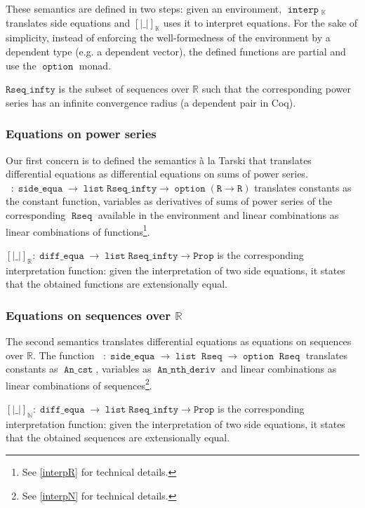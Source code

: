 \documentclass{article}
\newcommand{\Prop}{\texttt{Prop}}
\newcommand{\coq}{Coq}
\newcommand{\N}{\mathbb{N}}
\newcommand{\R}{\mathbb{R}}
\DeclareMathOperator{\Rseq}{\mathtt{Rseq}}
\DeclareMathOperator{\option}{\mathtt{option}}
\DeclareMathOperator{\alist}{\mathtt{list}}
\DeclareMathOperator{\de}{\mathtt{diff\_equa}}
\DeclareMathOperator{\se}{\mathtt{side\_equa}}
\DeclareMathOperator{\Interp}{\mathtt{interp}}
\DeclareMathOperator{\IR}{\Interp_{\R}}
\DeclareMathOperator{\IN}{\Interp_{\N}}
\DeclareMathOperator{\C}{\mathtt{An\_cst}}
\DeclareMathOperator{\Dn}{\mathtt{An\_nth\_deriv}}
\begin{document}
These semantics are defined in two steps: given an environment,
$\Interp{}_{\mathbb{K}}$ translates side equations and
$\left[\left| \_ \right|\right]_{\mathbb{K}}$ uses it to interpret equations.
For the sake of simplicity, instead of enforcing the well-formedness of the
environment by a dependent type (e.g. a dependent vector),
the defined functions are partial and use the $\option{}$ monad.

$\mathtt{Rseq\_infty}$ is the subset of sequences over $\R$ such that the
corresponding power series has an infinite convergence radius (a dependent
pair in \coq{}).

\subsubsection{Equations on power series}

Our first concern is to defined the semantics \`a la Tarski that translates
differential equations as differential equations on sums of power series.
$\IR : \se \rightarrow \alist{} \mathtt{Rseq\_infty} \rightarrow \option{}
(\texttt{R} \rightarrow \texttt{R})$ translates constants as the constant function,
variables as derivatives of sums of power series of the corresponding $\Rseq$
available in the environment and linear combinations as linear combinations of
functions\footnote{See \ref{interpR} for technical details.}.

$\left[\left| \_ \right|\right]_{\R} : \de \rightarrow \alist{}
\mathtt{Rseq\_infty} \rightarrow \Prop$ is the corresponding interpretation
function: given the interpretation of two side equations, it states that the
obtained functions are extensionally equal.


\subsubsection{Equations on sequences over $\R$}

The second semantics translates differential equations as equations on
sequences over $\R$.  The function $\IN :
\se \rightarrow \alist{} \Rseq \rightarrow \option{} \Rseq$ translates
constants as $\C{}$, variables as $\Dn{}$ and linear combinations as linear
combinations of sequences\footnote{See \ref{interpN} for technical details.}.

$\left[\left| \_ \right|\right]_{\N} : \de \rightarrow \alist{}
\mathtt{Rseq\_infty} \rightarrow \Prop$ is the corresponding interpretation
function:  given the interpretation of two side equations, it states that the
obtained sequences are extensionally equal.
\end{document}
